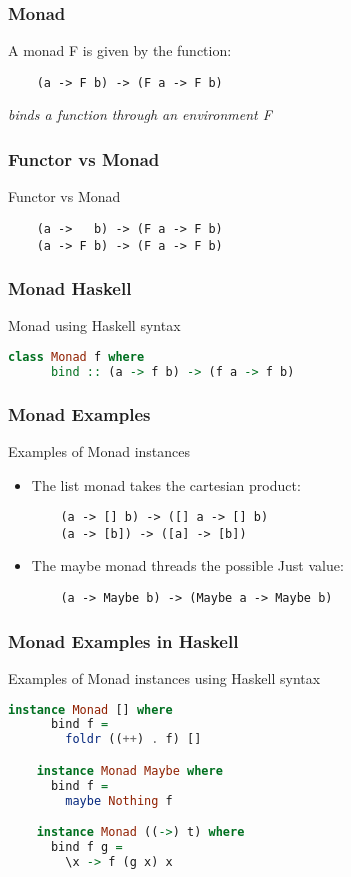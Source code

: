 \begin{frame}[fragile]
\frametitle{Monad}
\begin{block}{A monad F is given by the function:}
\begin{lstlisting}
    (a -> F b) -> (F a -> F b)
\end{lstlisting}
\end{block}
\emph{binds a function through an environment F}
\end{frame}

\begin{frame}[fragile]
\frametitle{Functor vs Monad}
\begin{block}{Functor vs Monad}
\begin{lstlisting}
    (a ->   b) -> (F a -> F b)
    (a -> F b) -> (F a -> F b)
\end{lstlisting}
\end{block}
\end{frame}

\begin{frame}[fragile]
\frametitle{Monad Haskell}
\begin{block}{Monad using Haskell syntax}
\begin{lstlisting}[language=haskell]
    class Monad f where
      bind :: (a -> f b) -> (f a -> f b)
\end{lstlisting}
\end{block}
\end{frame}

\begin{frame}[fragile]
\frametitle{Monad Examples}
\begin{block}{Examples of Monad instances}
\begin{itemize}
  \item The list monad takes the cartesian product:
    \begin{lstlisting}
    (a -> [] b) -> ([] a -> [] b)
    (a -> [b]) -> ([a] -> [b])
    \end{lstlisting}
  \item The maybe monad threads the possible Just value:
    \begin{lstlisting}
    (a -> Maybe b) -> (Maybe a -> Maybe b)
    \end{lstlisting}    
\end{itemize}
\end{block}
\end{frame}

\begin{frame}[fragile]
\frametitle{Monad Examples in Haskell}
\begin{block}{Examples of Monad instances using Haskell syntax}
\begin{lstlisting}[language=haskell]
    instance Monad [] where
      bind f =
        foldr ((++) . f) []

    instance Monad Maybe where
      bind f =
        maybe Nothing f

    instance Monad ((->) t) where
      bind f g =
        \x -> f (g x) x
\end{lstlisting}
\end{block}
\end{frame}
